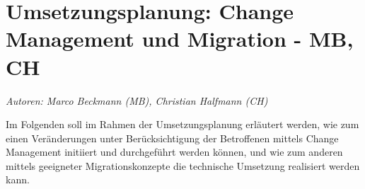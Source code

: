 \chapter{Umsetzungsplanung: Change Management und Migration - MB, CH}
\label{chapter_changemanagement_migration}
\textit{Autoren: Marco Beckmann (MB), Christian Halfmann (CH)}

Im Folgenden soll im Rahmen der Umsetzungsplanung erläutert werden, wie zum  einen Veränderungen unter Berücksichtigung der Betroffenen mittels Change Management initiiert und durchgeführt werden können, und wie zum anderen mittels geeigneter Migrationskonzepte die technische Umsetzung realisiert werden kann.




